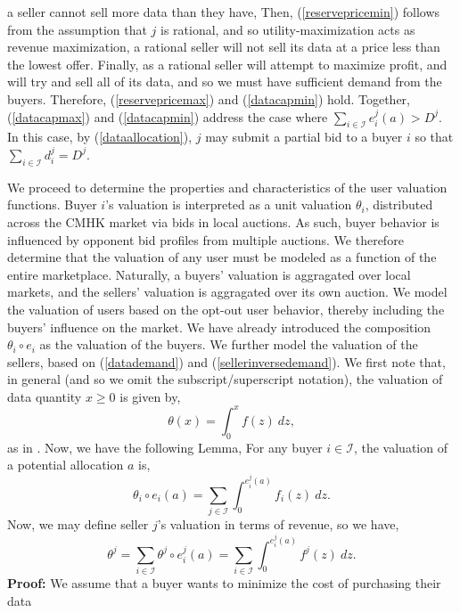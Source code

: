\documentclass[12pt]{article}
\theoremstyle{definition}
\newcommand{\mcI}{\mathcal{I}}
\begin{document}
\begin{multicols}{2}
a seller cannot sell more data than they have,
Then, (\ref{reservepricemin})
follows from the assumption that $j$ is rational, and so utility-maximization
acts as revenue maximization, a rational seller will not sell its
data at a price less than the lowest offer. Finally, as a rational seller will
attempt to maximize profit, and will try and sell all of its data, and so we
must have sufficient demand
from the buyers. Therefore, (\ref{reservepricemax}) and (\ref{datacapmin}) hold. Together, (\ref{datacapmax}) and
(\ref{datacapmin}) address the case where $\sum_{i\in\mcI} e_i^j(a) >  D^j$. In
this case, by (\ref{dataallocation}), $j$ may submit a partial bid to a buyer
$i$ so that $\sum_{i\in\mcI} d^j_i = D^j$.

We proceed to determine the properties and characteristics of the user valuation functions. Buyer $i$'s valuation is interpreted as a unit valuation $\theta_i$,
distributed across the CMHK market via bids in local auctions. 
As such, buyer behavior is influenced by opponent bid profiles from multiple auctions.
We therefore determine that the valuation of any user must be modeled as a function of the entire
marketplace. Naturally, a buyers' valuation is aggragated over local markets, and the
sellers' valuation is aggragated over its own auction. We model the valuation of
users based on the opt-out user behavior, thereby including the buyers'
influence on the market. We have already introduced the composition $\theta_i
\circ e_i$ as the valuation of the buyers. We further model the valuation of the sellers, based on
(\ref{datademand}) and (\ref{sellerinversedemand}). We first note that, in
general (and so we omit the subscript/superscript notation), the valuation of data quantity $x\ge 0$ is given by,
$$
    \theta(x) = \int_0^x f(z) \ dz,
$$ 
as in \cite{semret}. Now, we have the following Lemma,
{
\label{uservaluation}
For any buyer $i\in\mcI$, the valuation of a potential
allocation $a$ is, 
\begin{equation}\label{buyervaluation}
    \theta_i \circ e_i(a) = \displaystyle\sum_{j\in\mcI}
 \int_0^{e_i^j(a)} f_i(z) \ dz.
\end{equation}
Now, we may define seller $j$'s valuation in terms of revenue, so we have,
\begin{equation}\label{sellervaluation}
    \theta^j= \displaystyle\sum_{i\in\mcI} \theta^j \circ e_i^j(a) = \sum_{i\in\mcI}
 \int_0^{e_i^j(a)} f^j(z) \ dz.
\end{equation}
}
\textbf{Proof:} 
We assume that a buyer wants to minimize the cost of purchasing their data

\end{multicols}
\end{document}
